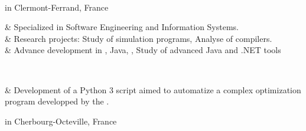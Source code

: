	{\\ in Clermont-Ferrand, France}

\begin{cvstate}
	\begin{cvtable}{2.5ex}
		{\tiny {}} & Specialized in Software Engineering and Information Systems.\\
		{\tiny {}} & Research projects: Study of simulation programs, Analyse of compilers.\\
		{\tiny {}} & Advance development in \cplusplus, Java, \csharp, Study of advanced Java and .NET tools\\
	\end{cvtable}

	\\
	\begin{cvtable}{2.5ex}
			{\tiny {}} & Development of a Python 3 script aimed to automatize a complex optimization program developped by the .
	\end{cvtable}
\end{cvstate}

	{ in Cherbourg-Octeville, France}

\vspace{0.2cm}
